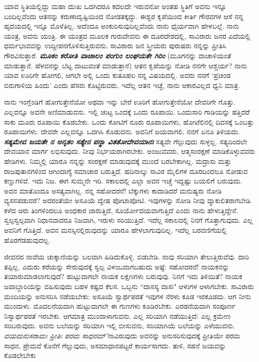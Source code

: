 \vspace{-0.5cm}

ಯಾವ ಸ್ಥಿತಿಯಲ್ಲಿದ್ದು ಮಹಾ ದುಃಖ ಒದಗಿದರೂ ಕದಲದೇ ಇರುವನೋ ಅಂತಹ ಸ್ಥಿತಿಗೆ ಅವನು ಇನ್ನೂ ಬಂದಿಲ್ಲವೆಂದು ಆತನನ್ನು ಕರುಣಾದೃಷ್ಟಿಯಿಂದ ನೋಡತಕ್ಕದ್ದು. ಈಶ್ವರ ಕೃಪೆಯಿಂದ ಕೀರ್ತಿ ಗೌರವಗಳ ಆಸೆ ನನ್ನ ಹೃದಯದಲ್ಲಿ ಇನ್ನೂ ಮೊಳೆತಿಲ್ಲ. ಅದೆಂದೂ ಅಂಕುರಿಸುವುದಿಲ್ಲವೆಂದು ನಾನು ಧೈರ್ಯವಾಗಿ ಹೇಳಬಲ್ಲೆ. ನಾನು ಯಂತ್ರ, ಅವನು ಯಂತ್ರಿ. ಈ ಯಂತ್ರದ ಮೂಲಕ ಗುರುದೇವನು ಈ ದೂರದೇಶದಲ್ಲಿ, ಸಾವಿರಾರು ಜನರ ಎದೆಯಲ್ಲಿ ಧರ್ಮಭಾವವನ್ನು ಉದ್ದೀಪನಗೊಳಿಸುತ್ತಿರುವನು. ಸಾವಿರಾರು ಜನ ಸ್ತ್ರೀಯರು ಪುರುಷರು ನನ್ನನ್ನು ಪ್ರೀತಿಸಿ ಗೌರವಿಸುತ್ತಾರೆ. \textbf{\textit{ಮೂಕಂ ಕರೋತಿ ವಾಚಾಲಂ ಪಂಗುಂ ಲಂಘಯತೇ ಗಿರಿಂ}} (ಮೂಗನನ್ನು ವಾಚಾಳಿಯಂತೆ ಮಾಡುತ್ತಾನೆ. ಹೆಳವನನ್ನು ಬೆಟ್ಟ ದಾಟುವಂತೆ ಮಾಡುತ್ತಾನೆ) ಆತನ ಕೃಪೆಯನ್ನು ನೋಡಿ ನನಗೇ ಆಶ್ಚರ್ಯ? ನಾನು ಯಾವ ಊರಿಗೇ ಹೋಗಲಿ, ಆಗಲೇ ಅಲ್ಲಿ ಒಂದು ಕುತೂಹಲ ನನ್ನ ವಿಷಯದಲ್ಲಿ. ಅವರು ನನಗೆ `ಪ್ರಚಂಡ ಬಿರುಗಾಳಿಯ ಹಿಂದು' ಎಂದು ಹೆಸರು ಕೊಟ್ಟಿರುವರು. ಇದೆಲ್ಲ ಆತನ ಇಚ್ಛೆ, ನಾನು ಆಕಾರವಿಲ್ಲದ ಧ್ವನಿ ಮಾತ್ರ.

ನಾನು ಇಂಗ್ಲೆಂಡಿಗೆ ಹೋಗುತ್ತೇನೆಯೋ ಅಥವಾ ಇನ್ನು ಬೇರೆ ಊರಿಗೆ ಹೋಗುತ್ತೇ\break ನೆಯೋ ದೇವರಿಗೇ ಗೊತ್ತು. ಎಲ್ಲವನ್ನೂ ಅವನೇ ಅಣಿಮಾಡುವನು. ಇಲ್ಲಿ ಚುಟ್ಟ ಒಂದಕ್ಕೆ ಒಂದು ರೂಪಾಯಿ. ಒಂದುಸಾರಿ ಗಾಡಿಯನ್ನು ಹತ್ತಿದರೆ ಸಾಕು ಮೂರು ರೂಪಾಯಿ ಕೊಡಬೇಕು. ಒಂದು ಕೋಟಿಗೆ ನೂರು ರೂಪಾಯಿಗಳು, ಹೋಟೆಲಿನಲ್ಲಿ ದಿವಸಕ್ಕೆ ಒಂಬತ್ತು ರೂಪಾಯಿಗಳು. ದೇವರೇ ಎಲ್ಲವನ್ನೂ ಒದಗಿಸಿ ಕೊಡುವನು. ಅವನಿಗೆ ಜಯವಾಗಲಿ. ನನಗೆ ಏನೂ ತಿಳಿಯದು. \textbf{\textit{ಸತ್ಯಮೇವ ಜಯತೇ ನ ಅನೃತಂ ಸತ್ಯೇನ ಪನ್ಥಾ ವಿತತೋದೇವಯಾನಃ}} ಸತ್ಯವೇ ಗೆಲ್ಲುವುದು ಸುಳ್ಳಲ್ಲ. ಸತ್ಯದಿಂದಲೇ ದೇವಯಾನ ಮಾರ್ಗ ಲಭಿಸುವುದು. ನೀವು ನಿರ್ಭಯರಾಗಿರಬೇಕು. ಅಂಜುವವರು, ಆತ್ಮಸಂರಕ್ಷಣೆ ಮಾಡಿಕೊಳ್ಳುವವರು ಹೇಡಿಗಳು. ನಿಮ್ಮಲ್ಲಿ ಯಾರೂ ನನ್ನನ್ನು ಸಂರಕ್ಷಣೆ ಮಾಡುವುದಕ್ಕೆ ಮುಂದೆ ಬರಬೇಕಾಗಿಲ್ಲ. ಮದ್ರಾಸು ಮತ್ತು ರಾಜಪುತಾನಗಳಿಂದ ಆಗಿಂದಾಗ್ಯೆ ಸಮಾಚಾರ ಬರುತ್ತಿದೆ. ಹದಿನಾಲ್ಕು ಸಾವಿರ ಮೈಲಿಗಳ ದೂರದಿಂದಲೂ ನೋಡುವ ಕಣ್ಣುಗಳಿವೆ. ಇದು ನಿಜ. ಈಗ ಸುಮ್ಮನೇ ಇರಿ. ಸಕಾಲದಲ್ಲಿ ಎಲ್ಲಾ ಅವನ ಇಚ್ಚೆ ಇದ್ದಷ್ಟು ಬಯಲಿಗೆ ಬರುವುದು. ಅವನ ಮಾತೊಂದೂ ಅಸತ್ಯವಾಗಿಲ್ಲ. ನನ್ನ ಸಹೋದರನೆ! ಬೆಕ್ಕುಗಳು ಕಾದಾಡಿದರೆ ಮನುಷ್ಯರು ನೋಡಿ ವ್ಯಸನಪಡುವರೆ? ಅದರಂತೆಯೇ ಅಸೂಯೆ ದ್ವೇಷ ಪೋಟಾಪೋಟಿ. ಇವುಗಳನ್ನು ನೋಡಿ ನೀವು ವ್ಯಾಕುಲಿತರಾಗಬೇಡಿ. ಕಳೆದ ಆರು ತಿಂಗಳಿಂದಲೂ ಅಂಧಕಾರ ಜಾರುತ್ತಿದೆ, ಸೂರ್ಯೋದಯವಾಗುತ್ತಿದೆ ಎಂದು ನಾನು ಹೇಳುತ್ತಿದ್ದೇನೆ. ಸ್ವಲ್ಪಸ್ವಲ್ಪವಾಗಿ ನಿಧಾನವಾದರೂ ನಿಜವಾಗಿ, ಇರುಳು ಸರಿಯುತ್ತಿದೆ. ಇದೆಲ್ಲ ಸಕಾಲದಲ್ಲಿ ನಿನಗೆ ಗೊತ್ತಾಗುವುದು. ಎಲ್ಲ ಅವನಿಗೆ ಗೊತ್ತಿದೆ. ಅವನ ಮನಸ್ಸಿನಲ್ಲಿರುವುದನ್ನು ಯಾರೂ ಹೇಳಲಾಗುವುದಿಲ್ಲ. ಇದೆಲ್ಲ ಬರವಣಿಗೆಯಲ್ಲಿ ಹೊರಗೆಡಹುವುದಲ್ಲ.

ಜೀವನದ ನಾವೆಯ ಚುಕ್ಕಾಣಿಯನ್ನು ಬಲವಾಗಿ ಹಿಡಿದುಕೊಳ್ಳಿ. ಬಿಡಬೇಡಿ. ನಾವು ಸರಿಯಾಗಿ ತೇಲುತ್ತಿರುವೆವು. ದಾರಿ ತಪ್ಪಿಲ್ಲ. ಎದುರು ಕರೆಯನ್ನು ಸೇರುವುದಕ್ಕೆ ಸ್ವಲ್ಪ ವಿಳಂಬವಾಗಬಹುದು ಅಷ್ಟೆ: ಸಹೋದರನೆ! ನಾಯಕನನ್ನು ತಯಾರುಮಾಡಲಾಗುವುದೆ? ಹುಟ್ಟುವಾಗಲೇ ನಾಯಕ ಲಕ್ಷಣಗಳು ಬರುವುವು. ನಿನಗೆ ಇದು ತಿಳಿಯಿತೆ? ನಾಯಕ ಜವಾಬ್ದಾರಿಯನ್ನು ವಹಿಸುವುದು ಬಹಳ ಕಷ್ಟದ ಕೆಲಸ. ಒಬ್ಬನು ``ದಾಸಸ್ಯ ದಾಸಃ" ಆಳುಗಳ ಆಳಾಗಬೇಕು. ಸಾವಿರಾರು ಮಂದಿಯನ್ನು ಅನುಸರಿಸಿ ನಡೆಯಬೇಕು: ಅಸೂಯೆ ಸ್ವಾರ್ಥಪರತೆ ಇವುಗಳ ನೆರಳು ಕೂಡ ಇರಕೂಡದು. ಆಗ ನೀನು ಮುಂದಾಳು. ಮೊದಲನೆಯದಾಗಿ ಹುಟ್ಟುವಾಗಲೇ ಈ ಗುಣಗಳು ಕೂಡಿರಬೇಕು. ಎರಡನೆಯದಾಗಿ ಸಂಪೂರ್ಣ ನಿಸ್ವಾರ್ಥಪರತೆ ಇರಬೇಕು. ಆಗಮಾತ್ರ ಮುಂದಾಳಾಗುವನು. ಎಲ್ಲ ಸರಿಯಾಗಿ ನಡೆಯುತ್ತಿದೆ: ಎಲ್ಲ ಕ್ರಮೇಣ ಸರಿಬರುವುದು. ಅವನು ಬಲೆಯನ್ನು ಸರಿಯಾಗಿ ಇಲ್ಲಿ ಬೀಸುವನು, ಸರಿಯಾಗಿಯೆ ಬಲೆಯನ್ನು ಎಳೆಯುವನು. \textit{ವಯಮನುಸರಾಮಃ ಪ್ರೀತಿಃ ಪರಮ ಸಾಧನಮ್'}ನಾವಿರುವುದು ಅವನನ್ನು ಅನುಸರಿಸುವುದಕ್ಕೆ ಪ್ರೀತಿಯೇ ಪರಮ ಸಾಧನ, ಪ್ರೇಮವೆ ಕೊನೆಗೆ ಗೆಲ್ಲುವುದು, ಅಸಮಾಧಾನಪಟ್ಟರೆ ಕಾರ್ಯಸಾಗದು. ತಾಳಿ, ಸಹನೆ ಜಯವನ್ನು ಕೊಡಲೇಬೇಕು

